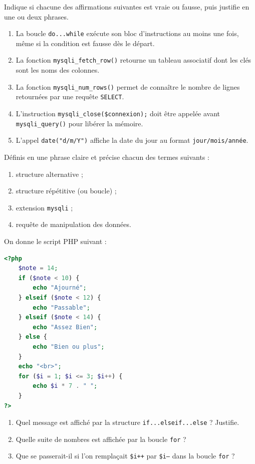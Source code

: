 \documentclass[11pt]{article}
\begin{document}
\begin{exercice}
Indique si chacune des affirmations suivantes est vraie ou fausse, puis justifie en une ou deux phrases.
\begin{enumerate}
\item La boucle \texttt{do...while} exécute son bloc d'instructions au moins une fois, même si la condition est fausse dès le départ.
\item La fonction \texttt{mysqli\_fetch\_row()} retourne un tableau associatif dont les clés sont les noms des colonnes.
\item La fonction \texttt{mysqli\_num\_rows()} permet de connaître le nombre de lignes retournées par une requête \texttt{SELECT}.
\item L'instruction \texttt{mysqli\_close(\$connexion);} doit être appelée avant \texttt{mysqli\_query()} pour libérer la mémoire.
\item L'appel \texttt{date("d/m/Y")} affiche la date du jour au format \texttt{jour/mois/année}.
\end{enumerate}
\end{exercice}

\begin{exercice}[Définitions]
Définis en une phrase claire et précise chacun des termes suivants :
\begin{enumerate}
\item structure alternative ;
\item structure répétitive (ou boucle) ;
\item extension \texttt{mysqli} ;
\item requête de manipulation des données.
\end{enumerate}
\end{exercice}

\begin{exercice}
On donne le script PHP suivant :
\begin{lstlisting}[language=Php]
<?php
    $note = 14;
    if ($note < 10) {
        echo "Ajourné";
    } elseif ($note < 12) {
        echo "Passable";
    } elseif ($note < 14) {
        echo "Assez Bien";
    } else {
        echo "Bien ou plus";
    }
    echo "<br>";
    for ($i = 1; $i <= 3; $i++) {
        echo $i * 7 . " ";
    }
?>
\end{lstlisting}
\begin{enumerate}
\item Quel message est affiché par la structure \texttt{if...elseif...else} ? Justifie.
\item Quelle suite de nombres est affichée par la boucle \texttt{for} ?
\item Que se passerait-il si l'on remplaçait \texttt{\$i++} par \texttt{\$i--} dans la boucle \texttt{for} ?
\end{enumerate}
\end{exercice}
\end{document}
